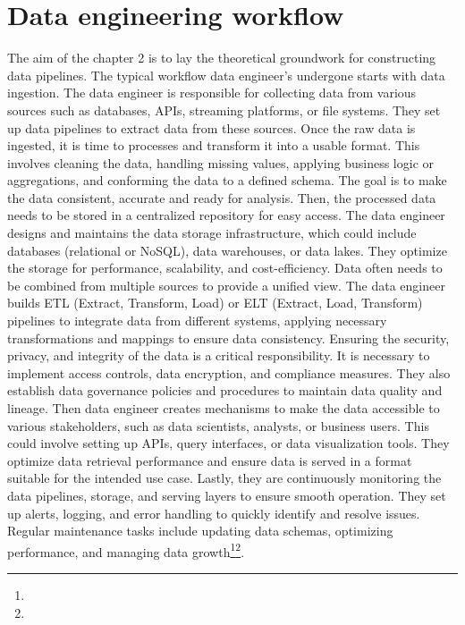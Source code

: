 \chapter{ Data engineering workflow }

The aim of the chapter 2 is to lay the theoretical groundwork for constructing data pipelines. The typical workflow data engineer's undergone starts with data ingestion. The data engineer is responsible for collecting data from various sources such as databases, APIs, streaming platforms, or file systems. They set up data pipelines to extract data from these sources. Once the raw data is ingested, it is time to processes and transform it into a usable format. This involves cleaning the data, handling missing values, applying business logic or aggregations, and conforming the data to a defined schema. The goal is to make the data consistent, accurate and ready for analysis. Then, the processed data needs to be stored in a centralized repository for easy access. The data engineer designs and maintains the data storage infrastructure, which could include databases (relational or NoSQL), data warehouses, or data lakes. They optimize the storage for performance, scalability, and cost-efficiency. Data often needs to be combined from multiple sources to provide a unified view. The data engineer builds ETL (Extract, Transform, Load) or ELT (Extract, Load, Transform) pipelines to integrate data from different systems, applying necessary transformations and mappings to ensure data consistency. Ensuring the security, privacy, and integrity of the data is a critical responsibility. It is necessary to implement access controls, data encryption, and compliance measures. They also establish data governance policies and procedures to maintain data quality and lineage. Then data engineer creates mechanisms to make the data accessible to various stakeholders, such as data scientists, analysts, or business users. This could involve setting up APIs, query interfaces, or data visualization tools. They optimize data retrieval performance and ensure data is served in a format suitable for the intended use case. Lastly, they are continuously monitoring the data pipelines, storage, and serving layers to ensure smooth operation. They set up alerts, logging, and error handling to quickly identify and resolve issues. Regular maintenance tasks include updating data schemas, optimizing performance, and managing data growth\footnote[17]{}\footnote[18]{}.


